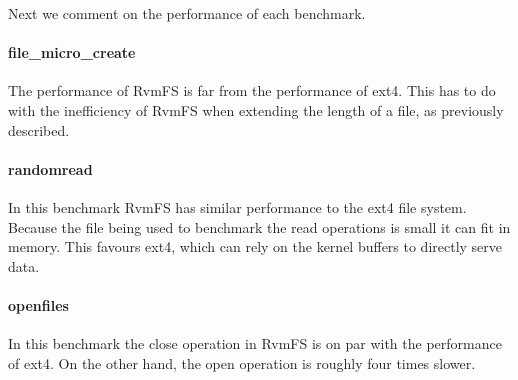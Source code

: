 Next we comment on the performance of each benchmark.

\paragraph{\bf file\_micro\_create}
The performance of RvmFS is far from the performance of ext4. This has to do with the inefficiency of RvmFS when extending the length of a file, as previously described.
\paragraph{\bf randomread} 
In this benchmark RvmFS has similar performance to the ext4 file system. Because the file being used to benchmark the read operations is small it can fit in memory. This favours ext4, 
which can rely on the kernel buffers to directly serve data.
\paragraph{\bf openfiles} 
In this benchmark the close operation in RvmFS is on par with the performance of ext4. On the other hand, the open operation is roughly four times slower.





